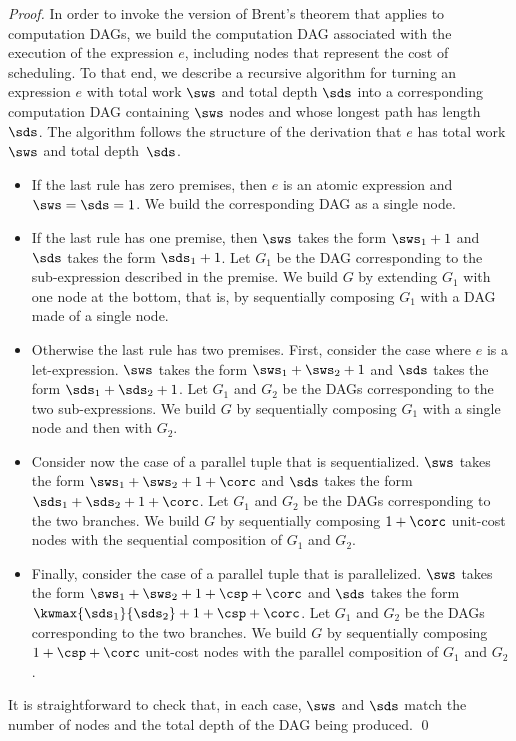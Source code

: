\begin{proof}
In order to invoke the version of Brent's theorem that applies 
to computation DAGs, we build the computation DAG associated 
with the execution of the expression $e$, including nodes that
represent the cost of scheduling.
To that end, we describe a recursive algorithm for turning 
an expression $e$ with total work $\sws$ and total depth $\sds$
into a corresponding computation DAG containing $\sws$ nodes and
whose longest path has length $\sds$.
The algorithm follows the structure of the derivation that
$e$ has total work $\sws$ and total depth~$\sds$.
\begin{itemize}
\item If the last rule has zero premises, then $e$ is an atomic expression
and $\sws = \sds = 1$. We build the corresponding DAG as a single node.
\item If the last rule has one premise, then $\sws$ takes the form $\sws_1 + 1$
and $\sds$ takes the form $\sds_1 + 1$. Let $G_1$ be the DAG corresponding
to the sub-expression described in the premise. We build $G$ by 
extending $G_1$ with one node at the bottom, that is, by
sequentially composing $G_1$ with a DAG made of a single node. 
\item Otherwise the last rule has two premises.
First, consider the case where $e$ is a let-expression. 
$\sws$ takes the form $\sws_1 + \sws_2 + 1$
and $\sds$ takes the form $\sds_1 + \sds_2 + 1$.
Let $G_1$ and $G_2$ be the DAGs corresponding to the two sub-expressions.
We build $G$ by sequentially composing $G_1$ with a single node and then 
with $G_2$.
\item Consider now the case of a parallel tuple that is sequentialized.
$\sws$ takes the form $\sws_1 + \sws_2 + 1 + \corc$
and $\sds$ takes the form $\sds_1 + \sds_2 + 1 + \corc$.
Let $G_1$ and $G_2$ be the DAGs corresponding to the two branches.
We build $G$ by sequentially composing $1 + \corc$ unit-cost nodes
with the sequential composition of $G_1$ and $G_2$.
\item Finally, consider the case of a parallel tuple that is parallelized.
$\sws$ takes the form $\sws_1 + \sws_2 + 1 + \csp + \corc$
and $\sds$ takes the form $\kwmax{\sds_1}{\sds_2} + 1 + \csp + \corc$.
Let $G_1$ and $G_2$ be the DAGs corresponding to the two branches.
We build $G$ by sequentially composing $1 + \csp + \corc$ unit-cost nodes
with the parallel composition of $G_1$ and $G_2$. 
\end{itemize}
It is straightforward to check that, in each case, $\sws$ and $\sds$ 
match the number of nodes and the total depth of the DAG being produced. \qed
\end{proof}
